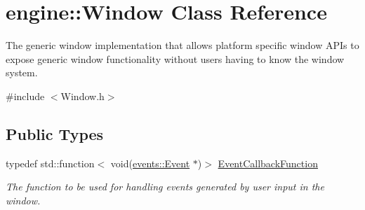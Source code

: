 \hypertarget{classengine_1_1Window}{}\section{engine\+:\+:Window Class Reference}
\label{classengine_1_1Window}


The generic window implementation that allows platform specific window A\+P\+Is to expose generic window functionality without users having to know the window system.  




{\ttfamily \#include $<$Window.\+h$>$}

\subsection*{Public Types}
\begin{DoxyCompactItemize}
\item 
\mbox{\label{classengine_1_1Window_a011d2563cc695bbc6a9fe2e64a29bd2f}} 
typedef std\+::function$<$ void(\hyperlink{classengine_1_1events_1_1Event}{events\+::\+Event} $\ast$)$>$ \hyperlink{classengine_1_1Window_a011d2563cc695bbc6a9fe2e64a29bd2f}{Event\+Callback\+Function}
\begin{DoxyCompactList}\small\item\em The function to be used for handling events generated by user input in the window. \end{DoxyCompactList}\end{DoxyCompactItemize}
